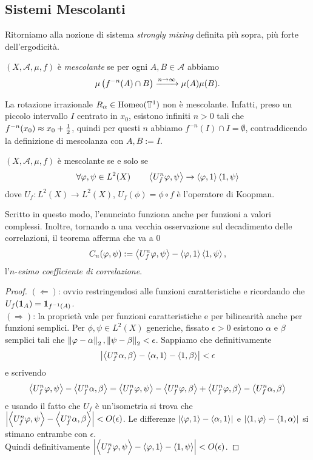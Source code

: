\subsection{Sistemi Mescolanti}

Ritorniamo alla nozione di sistema \emph{strongly mixing} definita più sopra, più forte dell'ergodicità.

\begin{defi}$(X,\mathcal{A},\mu,f)$ è \emph{mescolante} se
per ogni $A,B\in\mathcal{A}$ abbiamo \[\mu\left(f^{-n}(A)\cap B\right)\xrightarrow{n\to\infty}\mu(A)\mu(B).\]
\end{defi}

\begin{esempio}La rotazione irrazionale $R_\alpha\in\operatorname{Homeo}(\mathbb{T}^1)$ non è mescolante.
Infatti, preso un piccolo intervallo $I$ centrato in $x_0$, esistono infiniti $n>0$ tali che $f^{-n}(x_0)\approx x_0+\frac{1}{2}$,
quindi per questi $n$ abbiamo $f^{-n}(I)\cap I=\emptyset$, contraddicendo la definizione di mescolanza con $A,B:=I$.
\end{esempio}

\begin{prop}$(X,\mathcal{A},\mu,f)$ è mescolante se e solo se
\[\forall\varphi,\psi\in L^2(X) \qquad  \left\langle U_f^n\varphi,\psi\right\rangle\to\left\langle\varphi,1\right\rangle\left\langle1,\psi\right\rangle\]
dove $U_f:L^2(X)\to L^2(X)$, $U_f(\phi)=\phi\circ f$ è l'operatore di Koopman.
\end{prop}

\begin{oss} Scritto in questo modo, l'enunciato funziona anche per funzioni a valori complessi. 
Inoltre, tornando a una vecchia osservazione sul decadimento delle correlazioni, il teorema afferma che va a $0$
\[C_n(\varphi,\psi):=\left\langle U_f^n\varphi,\psi\right\rangle-\left\langle\varphi,1\right\rangle\left\langle1,\psi\right\rangle,\]
l'$n$-\emph{esimo coefficiente di correlazione}.\end{oss}

\begin{proof}$(\Leftarrow)$: ovvio restringendosi alle funzioni caratteristiche e ricordando che $U_f(\bm{1}_A)=\bm{1}_{f^{-1}(A)}$. \\
$(\Rightarrow)$: la proprietà vale per funzioni caratteristiche e per bilinearità anche per funzioni semplici.
Per $\phi,\psi\in L^2(X)$ generiche, fissato $\epsilon>0$ esistono $\alpha$ e $\beta$ semplici tali che
$\left\|\varphi-\alpha\right\|_2,\left\|\psi-\beta\right\|_2<\epsilon$. Sappiamo che definitivamente
\[ \left|\left\langle U_f^n\alpha,\beta\right\rangle-\left\langle\alpha,1\right\rangle-\left\langle1,\beta\right\rangle\right|<\epsilon \]
e scrivendo
\[ \left\langle U_f^n\varphi,\psi\right\rangle-\left\langle U_f^n\alpha,\beta\right\rangle
=\left\langle U_f^n\varphi,\psi\right\rangle-\left\langle U_f^n\varphi,\beta\right\rangle+\left\langle U_f^n\varphi,\beta\right\rangle-\left\langle U_f^n\alpha,\beta\right\rangle \]
e usando il fatto che $U_f$ è un'isometria si trova che $\left|\left\langle U_f^n\varphi,\psi\right\rangle-\left\langle U_f^n\alpha,\beta\right\rangle\right|<O(\epsilon)$.
Le differenze $\left|\left\langle\varphi,1\right\rangle-\left\langle\alpha,1\right\rangle\right|$ e $\left|\left\langle1,\varphi\right\rangle-\left\langle1,\alpha\right\rangle\right|$ si stimano entrambe con $\epsilon$. \\
Quindi definitivamente $\left|\left\langle U_f^n\varphi,\psi\right\rangle-\left\langle\varphi,1\right\rangle-\left\langle1,\psi\right\rangle\right|<O(\epsilon)$.
\end{proof}

